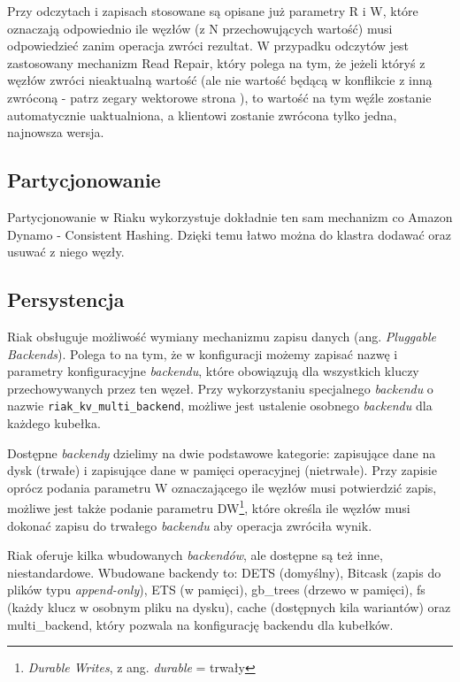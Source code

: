 Przy odczytach i zapisach stosowane są opisane już parametry R i W, które oznaczają odpowiednio ile węzłów (z N przechowujących wartość) musi odpowiedzieć zanim operacja zwróci rezultat.
W przypadku odczytów jest zastosowany mechanizm Read Repair, który polega na tym, że jeżeli któryś z węzłów zwróci nieaktualną wartość (ale nie wartość będącą w konflikcie z inną zwróconą - patrz zegary wektorowe strona \pageref{sec:dynamo-vector-clocks}), to wartość na tym węźle zostanie automatycznie uaktualniona, a klientowi zostanie zwrócona tylko jedna, najnowsza wersja. 

\subsection*{Partycjonowanie}

Partycjonowanie w Riaku wykorzystuje dokładnie ten sam mechanizm co Amazon Dynamo - Consistent Hashing.
Dzięki temu łatwo można do klastra dodawać oraz usuwać z niego węzły.

\subsection*{Persystencja}

Riak obsługuje możliwość wymiany mechanizmu zapisu danych (ang. \emph{Pluggable Backends}).
Polega to na tym, że w konfiguracji możemy zapisać nazwę i parametry konfiguracyjne \emph{backendu}, które obowiązują dla wszystkich kluczy przechowywanych przez ten węzeł.
Przy wykorzystaniu specjalnego \emph{backendu} o nazwie \verb+riak_kv_multi_backend+, możliwe jest ustalenie osobnego \emph{backendu} dla każdego kubełka.

Dostępne \emph{backendy} dzielimy na dwie podstawowe kategorie: zapisujące dane na dysk (trwałe) i zapisujące dane w pamięci operacyjnej (nietrwałe).
Przy zapisie oprócz podania parametru W oznaczającego ile węzłów musi potwierdzić zapis, możliwe jest także podanie parametru DW\footnote{\emph{Durable Writes}, z ang. \emph{durable} = trwały}, które określa ile węzłów musi dokonać zapisu do trwałego \emph{backendu} aby operacja zwróciła wynik.

Riak oferuje kilka wbudowanych \emph{backendów}, ale dostępne są też inne, niestandardowe.
Wbudowane backendy to: DETS (domyślny), Bitcask (zapis do plików typu \emph{append-only}), ETS (w pamięci), gb\_trees (drzewo w pamięci), fs (każdy klucz w osobnym pliku na dysku), cache (dostępnych kila wariantów) oraz multi\_backend, który pozwala na konfigurację backendu dla kubełków. 


